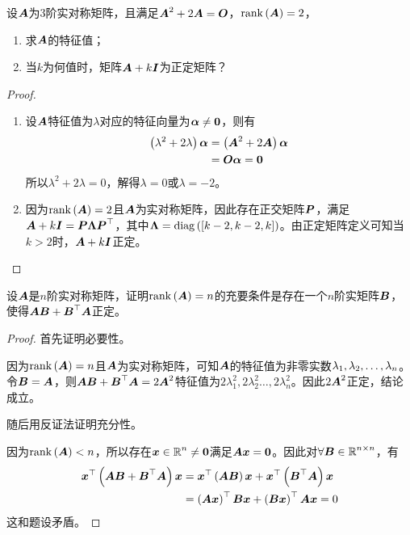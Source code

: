 \begin{problem}
设\(\mata\)为\(3\)阶实对称矩阵，且满足\(\mata^2+2\mata=\mato\)，\(\rank{\mata}=2\)，
\begin{enumerate}
    \item 求\(\mata\)的特征值；
    \item 当\(k\)为何值时，矩阵\(\mata+k\mati\)为正定矩阵？
\end{enumerate}
\end{problem}
\begin{proof}
    \begin{enumerate}
        \item {
              设\(\mata\)特征值为\(\lambda\)对应的特征向量为\(\vecal\neq\veczero\)，则有
              \begin{align*}
                  \mypar{\lambda^2+2\lambda}\vecal & =\mypar{\mata^2+2\mata}\vecal \\
                                                   & =\mato\vecal=\veczero
              \end{align*}
              所以\(\lambda^2+2\lambda=0\)，解得\(\lambda=0\)或\(\lambda=-2\)。
              }
        \item {
              因为\(\rank{\mata}=2\)且\(\mata\)为实对称矩阵，因此存在正交矩阵\(\matp\)，满足\(\mata+k\mati=\matp\matlam\matp^\top\)，其中\(\matlam=\diag{\mat{k-2,k-2,k}}\)。由正定矩阵定义可知当\(k>2\)时，\(\mata+k\mati\)正定。
              }
    \end{enumerate}
\end{proof}

\begin{problem}
设\(\mata\)是\(n\)阶实对称矩阵，证明\(\rank{\mata}=n\)的充要条件是存在一个\(n\)阶实矩阵\(\matb\)，使得\(\mata\matb+\matb^\top\mata\)正定。
\end{problem}
\begin{proof}
    首先证明必要性。

    因为\(\rank{\mata}=n\)且\(\mata\)为实对称矩阵，可知\(\mata\)的特征值为非零实数\(\enums{\lambda}{n}\)。令\(\matb=\mata\)，则\(\mata\matb+\matb^\top\mata=2\mata^2\)特征值为\(2\lambda_1^2,2\lambda_2^2\dots,2\lambda_n^2\)。因此\(2\mata^2\)正定，结论成立。

    随后用反证法证明充分性。

    因为\(\rank{\mata}<n\)，所以存在\(\vecx\in\rea^n\neq\veczero\)满足\(\mata\vecx=\veczero\)。因此对\(\forall\matb\in\rea^{n\times n}\)，有
    \begin{align*}
        \vecx^\top\mypar{\mata\matb+\matb^\top\mata}\vecx & =\vecx^\top\mypar{\mata\matb}\vecx+\vecx^\top\mypar{\matb^\top\mata}\vecx \\
                                                          & =\mypar{\mata\vecx}^\top\matb\vecx+\mypar{\matb\vecx}^\top\mata\vecx=0
    \end{align*}
    这和题设矛盾。
\end{proof}

